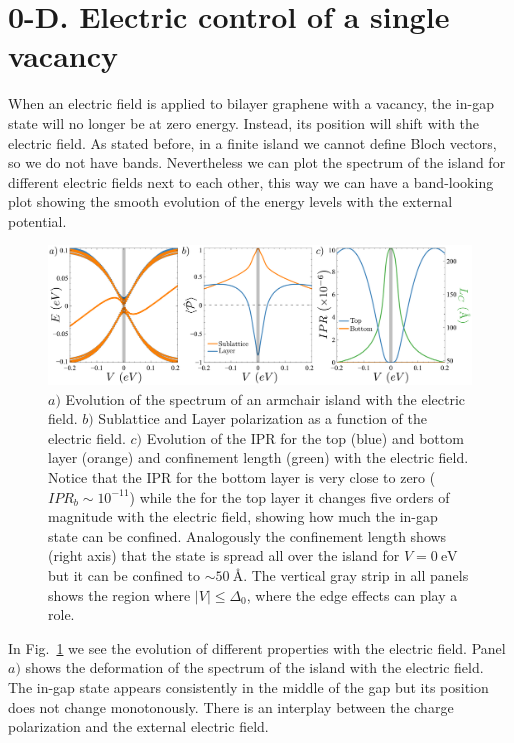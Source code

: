 \section{0-D. Electric control of a single vacancy} %
When an electric field is applied to bilayer graphene with a vacancy, the in-gap state will no longer be at zero energy. Instead, its position will shift with the electric field. As stated before, in a finite island we cannot define Bloch vectors, so we do not have bands. Nevertheless we can plot the spectrum of the island for different electric fields next to each other, this way we can have a band-looking plot showing the smooth evolution of the energy levels with the external potential.
\begin{figure}[!ht!]
\centering
\includegraphics{artlat/fig/spectrum.pdf}
\vspace{-20pt}
\caption{$a)$ Evolution of the spectrum of an armchair island with the electric field. $b)$ Sublattice and Layer polarization as a function of the electric field. $c)$ Evolution of the IPR for the top (blue) and bottom layer (orange) and confinement length (green) with the electric field. Notice that the IPR for the bottom layer is very close to zero ($IPR_b\sim10^{-11}$) while the for the top layer it changes five orders of magnitude with the electric field, showing how much the in-gap state can be confined. Analogously the confinement length shows (right axis) that the state is spread all over the island for $V=\SI{0}{\eV}$ but it can be confined to $\sim\SI{50}{\angstrom}$. The vertical gray strip in all panels shows the region where $|V|\leqslant\Delta_0$, where the edge effects can play a role.}
\label{spectrum}
\end{figure}
In Fig.~\ref{spectrum} we see the evolution of different properties with the electric field. Panel $a)$ shows the deformation of the spectrum of the island with the electric field. The in-gap state appears consistently in the middle of the gap but its position does not change monotonously. There is an interplay between the charge polarization and the external electric field.
